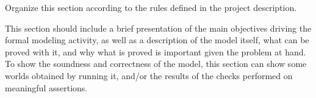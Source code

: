 \begin{flushleft}
Organize this section according to the rules defined in the project description. 


This section should include a brief presentation of the main objectives driving the formal modeling activity, as well as a description of the model itself, what can be proved with it, and why what is proved is important given the problem at hand. To show the soundness and correctness of the model, this section can show some worlds obtained by running it, and/or the results of the checks performed on meaningful assertions.

\end{flushleft}


